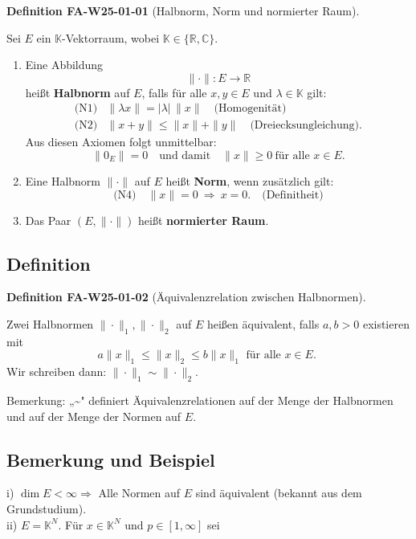 \documentclass[10pt, letterpaper]{article}
\newcommand{\CustomHeading}[3]{%
  \par\medskip\noindent%
  \textbf{#1 #2} \textnormal{(#3)}.\enskip%
}
\newenvironment{DEF}[2]{\begin{unitbox}\CustomHeading{Definition}{#1}{#2}}{\end{unitbox}}
\begin{document}
\begin{DEF}{FA-W25-01-01}{Halbnorm, Norm und normierter Raum}
Sei $E$ ein $\mathbb{K}$-Vektorraum, wobei $\mathbb{K}\in\{\mathbb{R},\mathbb{C}\}$.

\begin{enumerate}
\item[(i)] Eine Abbildung 
\[
\|\cdot\|:E\longrightarrow\mathbb{R}
\]
heißt \textbf{Halbnorm} auf $E$, falls für alle $x,y\in E$ und $\lambda\in\mathbb{K}$ gilt:
\[
\begin{array}{ll}
\text{(N1)} & \|\lambda x\|=|\lambda|\,\|x\| \quad\text{(Homogenität)}\\[0.4em]
\text{(N2)} & \|x+y\|\le\|x\|+\|y\| \quad\text{(Dreiecksungleichung)}.
\end{array}
\]
Aus diesen Axiomen folgt unmittelbar:
\[
\|0_E\|=0
\quad\text{und damit}\quad
\|x\|\ge0\ \text{für alle }x\in E.
\tag{N3}
\]

\item[(ii)] Eine Halbnorm $\|\cdot\|$ auf $E$ heißt \textbf{Norm}, wenn zusätzlich gilt:
\[
\text{(N4)} \quad
\|x\|=0\ \Longrightarrow\ x=0.
\quad\text{(Definitheit)}
\]
\item[(iii)] Das Paar $(E,\|\cdot\|)$ heißt \textbf{normierter Raum}.
\end{enumerate}
\end{DEF}



\subsection*{Definition}

\begin{DEF}{FA-W25-01-02}{Äquivalenzrelation zwischen Halbnormen}
Zwei Halbnormen $\|\cdot\|_{1},\|\cdot\|_{2}$ auf $E$ heißen äquivalent, falls $a, b>0$ existieren mit
$$
a\|x\|_{1} \leq\|x\|_{2} \leq b\|x\|_{1} \text { für alle } x \in E \text {. }
$$
Wir schreiben dann: $\|\cdot\|_{1} \sim\|\cdot\|_{2}$.

Bemerkung: „\~{}" definiert Äquivalenzrelationen auf der Menge der Halbnormen und auf der Menge der Normen auf $E$.
\end{DEF}

\subsection*{Bemerkung und Beispiel}


i) $\operatorname{dim} E<\infty \Rightarrow$ Alle Normen auf $E$ sind äquivalent (bekannt aus dem Grundstudium).\\
ii) $E=\mathbb{K}^{N}$. Für $x \in \mathbb{K}^{N}$ und $p \in[1, \infty]$ sei
\end{document}
